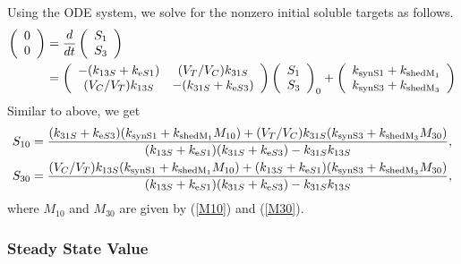 
Using the ODE system, we solve for the nonzero initial soluble targets as follows.
\begin{align*}
\left(\begin{array}{c}
0\\
0
\end{array}\right) & = \frac{d}{dt}\left(\begin{array}{c}
S_{1}\\
S_{3}
\end{array}\right) \\
& = \left(\begin{array}{cc}
-(k_{13S} + k_{\text{e} S1}) & (V_{T}/V_{C})k_{31S}\\
(V_{C}/V_{T})k_{13S}   & -(k_{31S} + k_{\text{e} S3})
\end{array}\right)\left(\begin{array}{c}
S_{1}\\
S_{3}
\end{array}\right)_{0} + \left(\begin{array}{c}
k_{\text{synS}1} + k_{\text{shedM}_1}\\
k_{\text{synS}3} + k_{\text{shedM}_3}
\end{array}\right)
\end{align*}
Similar to above, we get
\begin{align}
S_{10} & = \frac{(k_{31S} + k_{\text{e} S3})(k_{\text{synS}1} + k_{\text{shedM}_1}M_{10}) + (V_{T}/V_{C})k_{31S}(k_{\text{synS}3} + k_{\text{shedM}_3}M_{30})}{(k_{13S} + k_{\text{e} S1})(k_{31S} + k_{\text{e} S3}) - k_{31S}k_{13S}}, \label{S10}\\
S_{30} & = \frac{(V_{C}/V_{T})k_{13S}(k_{\text{synS}1} + k_{\text{shedM}_1}M_{10}) + (k_{13S} + k_{\text{e} S1})(k_{\text{synS}3} + k_{\text{shedM}_3}M_{30})}{(k_{13S} + k_{\text{e} S1})(k_{31S} + k_{\text{e} S3}) - k_{31S}k_{13S}}, \label{S30}
\end{align}
where $M_{10}$ and $M_{30}$ are given by (\ref{M10}) and (\ref{M30}).



\subsubsection{Steady State Value}



